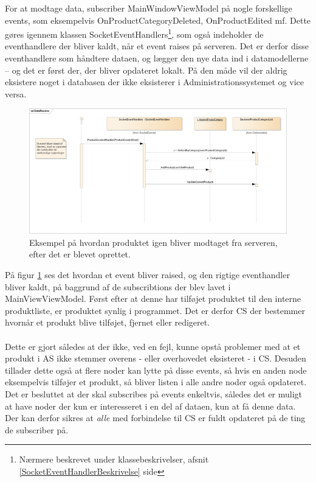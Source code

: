 For at modtage data, subscriber MainWindowViewModel på nogle forskellige events, som eksempelvis OnProductCategoryDeleted, OnProductEdited mf. Dette gøres igennem klassen SocketEventHandlers\footnote{Nærmere beskrevet under klassebeskrivelser, afsnit \ref{SocketEventHandlerBeskrivelse} side \pageref{SocketEventHandlerBeskrivelse}}, som også indeholder de eventhandlere der bliver kaldt, når et event raises på serveren.  Det er derfor disse eventhandlere som håndtere dataen, og lægger den nye data ind i datamodellerne – og det er først der, der bliver opdateret lokalt. På den måde vil der aldrig eksistere noget i databasen der ikke eksisterer i Administrationssystemet og vice versa. 
\begin{figure}[!h]
    \centering
    \includegraphics[width=1\textwidth]{Systemdesign/backend/Images/DataReceive.png}
    \caption{Eksempel på hvordan produktet igen bliver modtaget fra serveren, efter det er blevet oprettet.}
    \label{fig:DataReceive}
\end{figure}    

På figur \ref{fig:DataReceive} ses det hvordan et event bliver raised, og den rigtige eventhandler bliver kaldt, på baggrund af de subscribtions der blev lavet i MainViewViewModel. Først efter at denne har tilføjet produktet til den interne produktliste, er produktet synlig i programmet. Det er derfor \gls{CS} der bestemmer hvornår et produkt blive tilføjet, fjernet eller redigeret.\\
\\
Dette er gjort således at der ikke, ved en fejl, kunne opstå problemer med at et produkt i \gls{AS} ikke stemmer overens - eller overhovedet eksisteret - i \gls{CS}. Desuden tillader dette også at flere noder kan lytte på disse events, så hvis en anden node eksempelvis tilføjer et produkt, så bliver listen i alle andre noder også opdateret. Det er besluttet at der skal subscribes på events enkeltvis, således det er muligt at have noder der kun er interesseret i en del af dataen, kun at få denne data. 
Der kan derfor sikres at \textit{alle} med forbindelse til \gls{CS} er fuldt opdateret på de ting de subscriber på.

